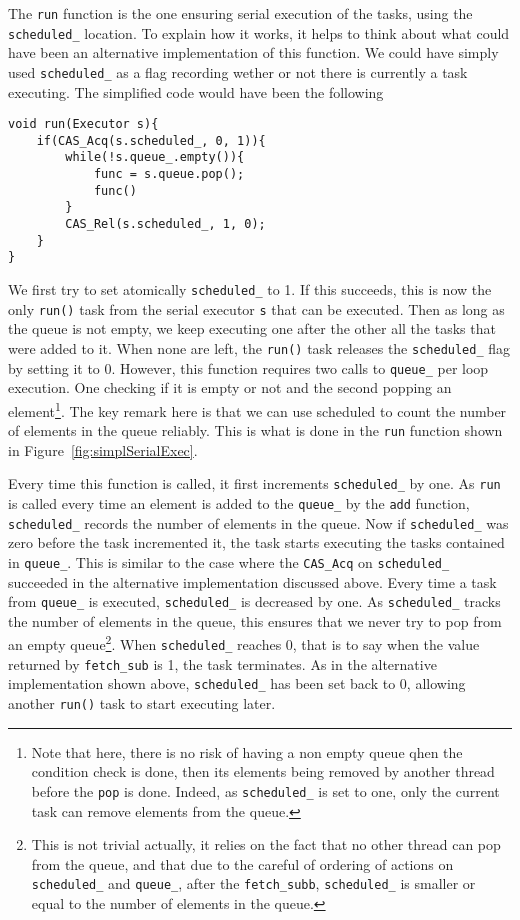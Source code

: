 The \texttt{run} function is the one ensuring serial execution of the tasks, using the \texttt{scheduled\_} location. To explain how it works, it helps to think about what could have been an alternative implementation of this function. We could have simply used \texttt{scheduled\_} as a flag recording wether or not there is currently a task executing. The simplified code would have been the following

\begin{lstlisting}
void run(Executor s){
	if(CAS_Acq(s.scheduled_, 0, 1)){
		while(!s.queue_.empty()){
			func = s.queue.pop();
			func()
		}
		CAS_Rel(s.scheduled_, 1, 0);
	}
}
\end{lstlisting}

We first try to set atomically \texttt{scheduled\_} to 1. If this succeeds, this is now the only \texttt{run()} task from the serial executor \texttt{s} that can be executed. Then as long as the queue is not empty, we keep executing one after the other all the tasks that were added to it. When none are left, the \texttt{run()} task releases the \texttt{scheduled\_} flag by setting it to 0. However, this function requires two calls to \texttt{queue\_} per loop execution. One checking if it is empty or not and the second popping an element\footnote{Note that here, there is no risk of having a non empty queue qhen the condition check is done, then its elements being removed by another thread before the \texttt{pop} is done. Indeed, as \texttt{scheduled\_} is set to one, only the current task can remove elements from the queue.}. The key remark here is that we can use scheduled to count the number of elements in the queue reliably. This is what is done in the \texttt{run} function shown in Figure~\ref{fig:simplSerialExec}.

Every time this function is called, it first increments \texttt{scheduled\_} by one. As \texttt{run} is called every time an element is added to the \texttt{queue\_} by the \texttt{add} function, \texttt{scheduled\_} records the number of elements in the queue. Now if \texttt{scheduled\_} was zero before the task incremented it, the task starts executing the tasks contained in \texttt{queue\_}. This is similar to the case where the \texttt{CAS\_Acq} on \texttt{scheduled\_} succeeded in the alternative implementation discussed above. Every time a task from \texttt{queue\_} is executed, \texttt{scheduled\_} is decreased by one. As \texttt{scheduled\_} tracks the number of elements in the queue, this ensures that we never try to pop from an empty queue\footnote{This is not trivial actually, it relies on the fact that no other thread can pop from the queue, and that due to the careful of ordering of actions on \texttt{scheduled\_} and \texttt{queue\_}, after the \texttt{fetch\_subb}, \texttt{scheduled\_} is smaller or equal to the number of elements in the queue.}. When \texttt{scheduled\_} reaches 0, that is to say when the value returned by \texttt{fetch\_sub} is 1, the task terminates. As in the alternative implementation shown above, \texttt{scheduled\_} has been set back to 0, allowing another \texttt{run()} task to start executing later.


